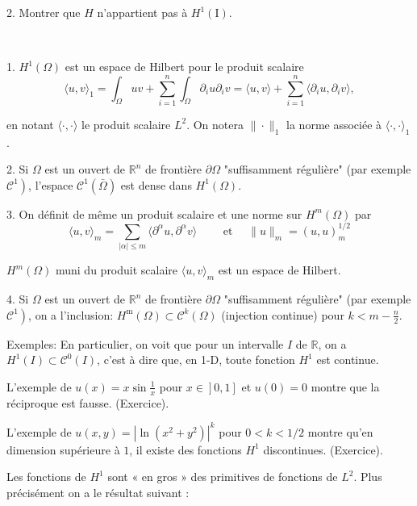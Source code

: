 2. Montrer que $H$ n'appartient pas à $H^1(\mathrm{I})$. 
\begin{theorem}\
	
1. 	$H^{1}(\Omega)$ est un espace de Hilbert pour le produit scalaire
\begin{equation}\label{H1}
	\langle u, v\rangle_{1}=\int_{\Omega} u v+\sum_{i=1}^{n} \int_{\Omega} \partial_{i} u \partial_{i} v=\langle u, v\rangle+\sum_{i=1}^{n}\langle\partial_{i} u, \partial_{i} v\rangle, 
\end{equation}

en notant $\langle\cdot, \cdot \rangle$ le produit scalaire $L^{2}$. On notera $\|\cdot\|_{1}$ la norme associée à $\langle \cdot, \cdot\rangle_{1}$.


2. 
Si $\Omega$ est un ouvert de $\mathbb{R}^{n}$ de frontière $\partial \Omega$ "suffisamment régulière" (par exemple
$\left.\mathcal{C}^{1}\right)$,  l'espace $\mathcal{C}^{1}(\bar{\Omega})$ est dense dans $H^{1}(\Omega)$. 



3. On définit de même un produit scalaire et une norme sur $H^{m}(\Omega)$ par
$$
\langle u, v\rangle_{m}=\sum_{|\alpha| \leq m}\langle \partial^{\alpha} u, \partial^{\alpha}v\rangle  \qquad \text { et } \quad\|u\|_{m}=(u, u)_{m}^{1 / 2}
$$

$H^{m}(\Omega)$ muni du produit scalaire $\langle u, v\rangle_{m}$ est un espace de Hilbert.

4.  Si $\Omega$ est un ouvert de $\mathbb{R}^{n}$ de frontière $\partial \Omega$ "suffisamment régulière" (par exemple
$\left.\mathcal{C}^{1}\right)$, on a l'inclusion: $H^{\mathrm{m}}(\Omega) \subset \mathcal{C}^{k}(\Omega)$ (injection continue) pour $k<m-\frac{n}{2}$.


\end{theorem}
Exemples: En particulier, on voit que pour un intervalle $I$ de $\mathbb{R}$, on a $H^{1}(I) \subset \mathcal{C}^{0}(I)$, c'est à dire que, en 1-D, toute fonction $H^{1}$ est continue.

L'exemple de $u(x)=x \sin \frac{1}{x}$ pour $\left.\left.x \in\right] 0,1\right]$ et $u(0)=0$ montre que la réciproque est fausse.  (Exercice).


L'exemple de $u(x, y)=\left|\ln \left(x^{2}+y^{2}\right)\right|^{k}$ pour $0<k<1 / 2$ montre qu'en dimension supérieure à $1$,  il existe des fonctions $H^{1}$ discontinues. (Exercice).


Les fonctions de $H^{1}$ sont « en gros » des primitives de fonctions de $L^{2}$. Plus précisément on a le résultat suivant :

